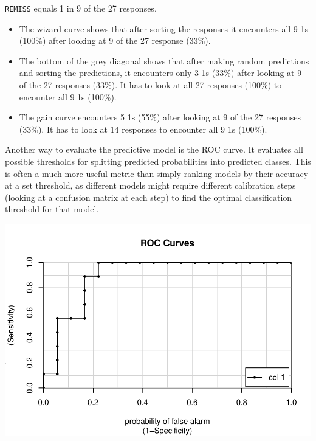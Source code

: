 \documentclass[
]{book}
\newenvironment{Shaded}{\begin{snugshade}}{\end{snugshade}}
\newcommand{\DataTypeTok}[1]{\textcolor[rgb]{0.13,0.29,0.53}{#1}}
\newcommand{\KeywordTok}[1]{\textcolor[rgb]{0.13,0.29,0.53}{\textbf{#1}}}
\newcommand{\NormalTok}[1]{#1}
\newcommand{\OperatorTok}[1]{\textcolor[rgb]{0.81,0.36,0.00}{\textbf{#1}}}
\newcommand{\OtherTok}[1]{\textcolor[rgb]{0.56,0.35,0.01}{#1}}
\providecommand{\tightlist}{%
  \setlength{\itemsep}{0pt}\setlength{\parskip}{0pt}}
\begin{document}
\texttt{REMISS} equals 1 in 9 of the 27 responses.

\begin{itemize}
\tightlist
\item
  The wizard curve shows that after sorting the responses it encounters all 9 1s (100\%) after looking at 9 of the 27 response (33\%).\\
\item
  The bottom of the grey diagonal shows that after making random predictions and sorting the predictions, it encounters only 3 1s (33\%) after looking at 9 of the 27 responses (33\%). It has to look at all 27 responses (100\%) to encounter all 9 1s (100\%).\\
\item
  The gain curve encounters 5 1s (55\%) after looking at 9 of the 27 responses (33\%). It has to look at 14 responses to encounter all 9 1s (100\%).
\end{itemize}

Another way to evaluate the predictive model is the ROC curve. It evaluates all possible thresholds for splitting predicted probabilities into predicted classes. This is often a much more useful metric than simply ranking models by their accuracy at a set threshold, as different models might require different calibration steps (looking at a confusion matrix at each step) to find the optimal classification threshold for that model.

\begin{Shaded}
\end{Shaded}

\includegraphics{data-sci_files/figure-latex/unnamed-chunk-46-1.pdf}
\end{document}
